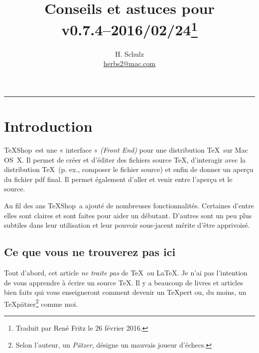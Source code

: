 \documentclass[11pt,french]{article}
\title{Conseils et astuces pour \TS\\\small v0.7.4--2016/02/24\thanks{Traduit par René Fritz le 26 février 2016.}}
\author{H. Schulz\\\small\href{mailto:herbs2@mac.com}{herbs2@mac.com}}
\date{}
\newcommand{\TS}{\textsf{\TeX Shop}}
\newcommand{\acr}[1]{\textsf{#1}}
\begin{document}
\maketitle

\tableofcontents

\begin{center}
\rule{0.5\textwidth}{1pt}
\end{center}

\section{Introduction}

\TS\ est une « interface » \emph{(Front End)} pour une distribution \TeX\ sur Mac OS~X. Il permet de créer et d'éditer des fichiers source \TeX{}, d'interagir avec la distribution \TeX\ (p. ex., composer le fichier source) et enfin de donner un aperçu du fichier \acr{pdf} final. Il permet également d'aller et venir entre l'aperçu et le source.


Au fil des ans \TS\ a ajouté de nombreuses fonctionnalités. Certaines d'entre elles sont claires et sont faites pour aider un débutant. D'autres sont un peu plus subtiles dans leur utilisation et leur pouvoir sous-jacent mérite d'être apprivoisé.


\subsection{Ce que vous ne trouverez pas ici}

Tout d'abord, cet article \emph{ne traite pas} de \TeX\ ou \LaTeX. Je n'ai pas l'intention de vous apprendre à écrire un source \TeX{}. Il y a beaucoup de livres et articles bien faits qui vous enseigneront comment devenir un \TeX pert ou, du moins, un \TeX pätzer\footnote{Selon l'auteur, un \emph{Pätzer}, désigne un mauvais joueur d'échecs.} comme moi.
 
\end{document}
